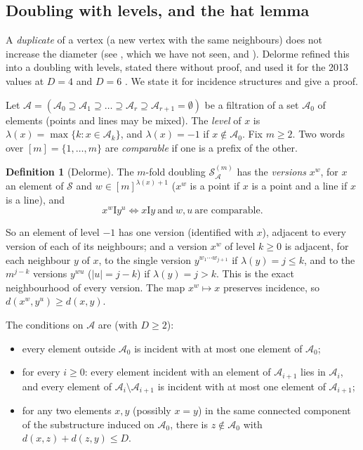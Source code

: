 \documentclass[11pt]{amsart}
\theoremstyle{definition}
\newtheorem{definition}[theorem]{Definition}
\theoremstyle{remark}
\numberwithin{equation}{section}
\newcommand{\I}{\mathrel{\mathrm I}}
\newcommand{\cA}{\mathcal A}
\newcommand{\cS}{\mathcal S}
\begin{document}
\subsection{Doubling with levels, and the hat lemma}\label{ssec:doubling}
A \emph{duplicate} of a vertex (a new vertex with the same neighbours) does not increase the diameter (see
\cite{DF84}, which we have not seen, and \cite[\S7]{D85a}). Delorme \cite[\S7]{D85a} refined this into a doubling with
levels, stated there without proof, and used it for the 2013 values at $D=4$ and $D=6$ \cite[\S8(a),(b)]{D85a}. We
state it for incidence structures and give a proof.

Let $\cA=(\cA_0\supseteq\cA_1\supseteq\dots\supseteq\cA_r\supseteq\cA_{r+1}=\emptyset)$ be a filtration of a set
$\cA_0$ of elements (points and lines may be mixed). The \emph{level} of $x$ is $\lambda(x)=\max\{k:x\in\cA_k\}$, and
$\lambda(x)=-1$ if $x\notin\cA_0$. Fix $m\ge2$. Two words over $[m]=\{1,\dots,m\}$ are \emph{comparable} if one is a
prefix of the other.

\begin{definition}[Delorme]\label{def:doubling}
The $m$-fold doubling $\cS^{(m)}_\cA$ has the \emph{versions} $x^w$, for $x$ an element of $\cS$ and
$w\in[m]^{\lambda(x)+1}$ ($x^w$ is a point if $x$ is a point and a line if $x$ is a line), and
\[
x^w\I y^u\iff x\I y\ \text{and}\ w,u\ \text{are comparable}.
\]
\end{definition}

So an element of level $-1$ has one version (identified with $x$), adjacent to every version of each of its neighbours;
and a version $x^w$ of level $k\ge0$ is adjacent, for each neighbour $y$ of $x$, to the single version
$y^{w_1\cdots w_{j+1}}$ if $\lambda(y)=j\le k$, and to the $m^{j-k}$ versions $y^{wu}$ ($|u|=j-k$) if $\lambda(y)=j>k$.
This is the exact neighbourhood of every version. The map $x^w\mapsto x$ preserves incidence, so
$d(x^w,y^u)\ge d(x,y)$.

The conditions on $\cA$ are (with $D\ge2$):
\begin{itemize}
\item[(L0)] every element outside $\cA_0$ is incident with at most one element of $\cA_0$;
\item[(L1)] for every $i\ge0$: every element incident with an element of $\cA_{i+1}$ lies in $\cA_i$, and every element
  of $\cA_i\setminus\cA_{i+1}$ is incident with at most one element of $\cA_{i+1}$;
\item[(C$_D$)] for any two elements $x,y$ (possibly $x=y$) in the same connected component of the substructure induced
  on $\cA_0$, there is $z\notin\cA_0$ with $d(x,z)+d(z,y)\le D$.
\end{itemize}
\end{document}
